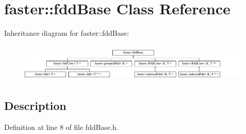 \hypertarget{classfaster_1_1fddBase}{}\section{faster\+:\+:fdd\+Base Class Reference}
\label{classfaster_1_1fddBase}
Inheritance diagram for faster\+:\+:fdd\+Base\+:\begin{figure}[H]
\begin{center}
\leavevmode
\includegraphics[height=1.826087cm]{classfaster_1_1fddBase}
\end{center}
\end{figure}


\subsection{Description}


Definition at line 8 of file fdd\+Base.\+h.

